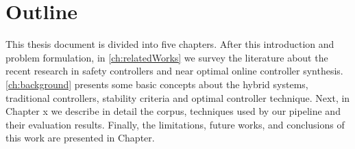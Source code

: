     \section{Outline}
    This thesis document is divided into five chapters. After this 
    introduction and problem formulation, in \autoref{ch:relatedWorks}
     we survey the literature about the recent research in safety
      controllers and near optimal online controller synthesis. 
    \autoref{ch:background} presents some basic concepts about the
    hybrid systems, traditional controllers,
    stability criteria and optimal controller technique. Next, in
    Chapter x we describe in detail the corpus, techniques used 
    by our pipeline and their evaluation results. Finally, the 
    limitations, future works, and conclusions of this work are 
    presented in Chapter.












